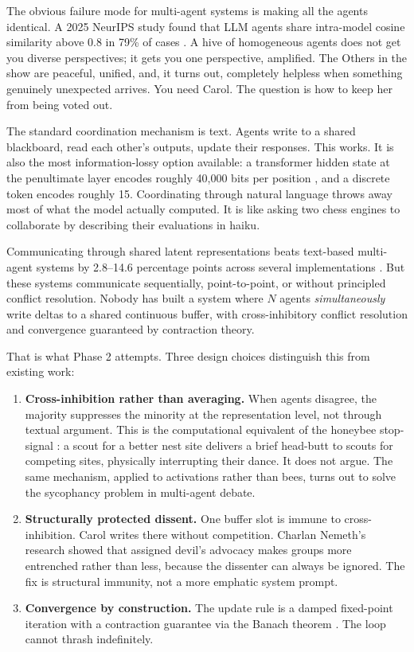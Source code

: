 \documentclass[10pt,twocolumn]{article}
\begin{document}
The obvious failure mode for multi-agent systems is making all the agents identical. A 2025 NeurIPS study found that LLM agents share intra-model cosine similarity above 0.8 in 79\% of cases \citep{artificialhivemind2025}. A hive of homogeneous agents does not get you diverse perspectives; it gets you one perspective, amplified. The Others in the show are peaceful, unified, and, it turns out, completely helpless when something genuinely unexpected arrives. You need Carol. The question is how to keep her from being voted out.

The standard coordination mechanism is text. Agents write to a shared blackboard, read each other's outputs, update their responses. This works. It is also the most information-lossy option available: a transformer hidden state at the penultimate layer encodes roughly 40,000 bits per position \citep{interlat2025}, and a discrete token encodes roughly 15. Coordinating through natural language throws away most of what the model actually computed. It is like asking two chess engines to collaborate by describing their evaluations in haiku.

Communicating through shared latent representations beats text-based multi-agent systems by 2.8--14.6 percentage points across several implementations \citep{latentmas2025, c2c2025, thoughtcomm2025}. But these systems communicate sequentially, point-to-point, or without principled conflict resolution. Nobody has built a system where $N$ agents \textit{simultaneously} write deltas to a shared continuous buffer, with cross-inhibitory conflict resolution and convergence guaranteed by contraction theory.

That is what Phase 2 attempts. Three design choices distinguish this from existing work:

\begin{enumerate}
    \item \textbf{Cross-inhibition rather than averaging.} When agents disagree, the majority suppresses the minority at the representation level, not through textual argument. This is the computational equivalent of the honeybee stop-signal \citep{seeley2012}: a scout for a better nest site delivers a brief head-butt to scouts for competing sites, physically interrupting their dance. It does not argue. The same mechanism, applied to activations rather than bees, turns out to solve the sycophancy problem in multi-agent debate.

    \item \textbf{Structurally protected dissent.} One buffer slot is immune to cross-inhibition. Carol writes there without competition. Charlan Nemeth's research \citep{nemeth2001} showed that assigned devil's advocacy makes groups more entrenched rather than less, because the dissenter can always be ignored. The fix is structural immunity, not a more emphatic system prompt.

    \item \textbf{Convergence by construction.} The update rule is a damped fixed-point iteration with a contraction guarantee via the Banach theorem \citep{bai2019deq}. The loop cannot thrash indefinitely.
\end{enumerate}
\end{document}
